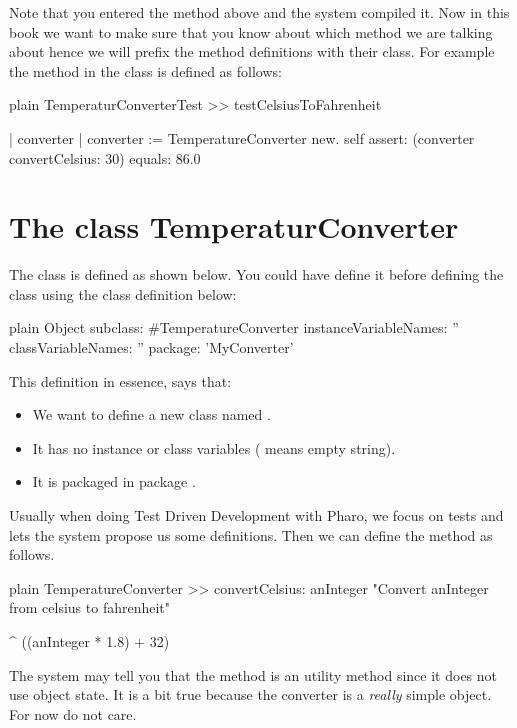 \documentclass[10pt,twoside,english]{_support/latex/sbabook/sbabook}
\begin{document}
Note that you entered the method above and the system compiled it. Now in this book we want to make sure that you know about which method we are talking about hence we will prefix the method definitions with their class. For example the method  in the class  is defined as follows: 

\begin{displaycode}{plain}
TemperaturConverterTest >> testCelsiusToFahrenheit

	| converter |
	converter := TemperatureConverter new. 
	self assert: (converter convertCelsius: 30) equals: 86.0
\end{displaycode}
\section{The class TemperaturConverter}
The class  is defined as shown below. You could have define it before defining the class   using the class definition below: 

\begin{displaycode}{plain}
Object subclass: #TemperatureConverter
	instanceVariableNames: ''
	classVariableNames: ''
	package: 'MyConverter'
\end{displaycode}

This definition in essence, says that:

\begin{itemize}
\item We want to define a new class named .
\item It has no instance or class variables ( means empty string).
\item It is packaged in package .
\end{itemize}

Usually when doing Test Driven Development with Pharo, we focus on tests and lets the system propose us some definitions. Then we can define the method as follows.

\begin{displaycode}{plain}
TemperatureConverter >> convertCelsius: anInteger 
	"Convert anInteger from celsius to fahrenheit"
	
	^ ((anInteger * 1.8) + 32)
\end{displaycode}

The system may tell you that the method is an utility method since it does not use object state. 
It is a bit true because the converter is a \textit{really} simple object. For now do not care. 
\end{document}

